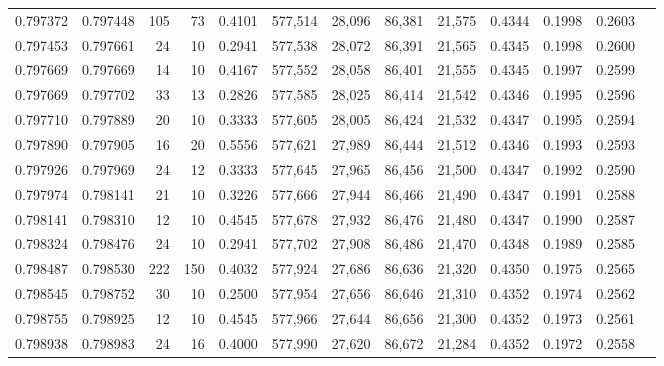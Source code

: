 \begin{tabular}{rrrrrrrrrrrrr}
0.797372 & 0.797448 &   105 &  73 &                                     0.4101 & 577,514 &  28,096 &  86,381 &  21,575 & 0.4344 & 0.1998 & 0.2603 \\
0.797453 & 0.797661 &    24 &  10 &                                     0.2941 & 577,538 &  28,072 &  86,391 &  21,565 & 0.4345 & 0.1998 & 0.2600 \\
0.797669 & 0.797669 &    14 &  10 &                                     0.4167 & 577,552 &  28,058 &  86,401 &  21,555 & 0.4345 & 0.1997 & 0.2599 \\
0.797669 & 0.797702 &    33 &  13 &                                     0.2826 & 577,585 &  28,025 &  86,414 &  21,542 & 0.4346 & 0.1995 & 0.2596 \\
0.797710 & 0.797889 &    20 &  10 &                                     0.3333 & 577,605 &  28,005 &  86,424 &  21,532 & 0.4347 & 0.1995 & 0.2594 \\
0.797890 & 0.797905 &    16 &  20 &                                     0.5556 & 577,621 &  27,989 &  86,444 &  21,512 & 0.4346 & 0.1993 & 0.2593 \\
0.797926 & 0.797969 &    24 &  12 &                                     0.3333 & 577,645 &  27,965 &  86,456 &  21,500 & 0.4347 & 0.1992 & 0.2590 \\
0.797974 & 0.798141 &    21 &  10 &                                     0.3226 & 577,666 &  27,944 &  86,466 &  21,490 & 0.4347 & 0.1991 & 0.2588 \\
0.798141 & 0.798310 &    12 &  10 &                                     0.4545 & 577,678 &  27,932 &  86,476 &  21,480 & 0.4347 & 0.1990 & 0.2587 \\
0.798324 & 0.798476 &    24 &  10 &                                     0.2941 & 577,702 &  27,908 &  86,486 &  21,470 & 0.4348 & 0.1989 & 0.2585 \\
0.798487 & 0.798530 &   222 & 150 &                                     0.4032 & 577,924 &  27,686 &  86,636 &  21,320 & 0.4350 & 0.1975 & 0.2565 \\
0.798545 & 0.798752 &    30 &  10 &                                     0.2500 & 577,954 &  27,656 &  86,646 &  21,310 & 0.4352 & 0.1974 & 0.2562 \\
0.798755 & 0.798925 &    12 &  10 &                                     0.4545 & 577,966 &  27,644 &  86,656 &  21,300 & 0.4352 & 0.1973 & 0.2561 \\
0.798938 & 0.798983 &    24 &  16 &                                     0.4000 & 577,990 &  27,620 &  86,672 &  21,284 & 0.4352 & 0.1972 & 0.2558 \\

\end{tabular}
